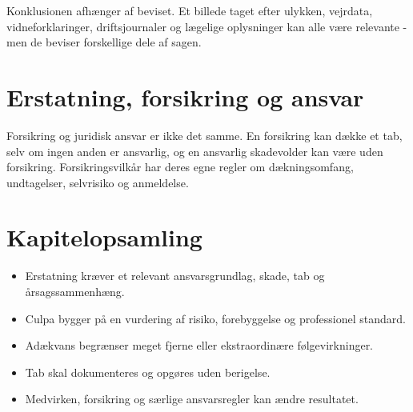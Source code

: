 Konklusionen afhænger af beviset. Et billede taget efter ulykken, vejrdata, vidneforklaringer, driftsjournaler og lægelige oplysninger kan alle være relevante - men de beviser forskellige dele af sagen.

\section{Erstatning, forsikring og ansvar}

Forsikring og juridisk ansvar er ikke det samme. En forsikring kan dække et tab, selv om ingen anden er ansvarlig, og en ansvarlig skadevolder kan være uden forsikring. Forsikringsvilkår har deres egne regler om dækningsomfang, undtagelser, selvrisiko og anmeldelse.



\section*{Kapitelopsamling}
\begin{itemize}
  \item Erstatning kræver et relevant ansvarsgrundlag, skade, tab og årsagssammenhæng.
  \item Culpa bygger på en vurdering af risiko, forebyggelse og professionel standard.
  \item Adækvans begrænser meget fjerne eller ekstraordinære følgevirkninger.
  \item Tab skal dokumenteres og opgøres uden berigelse.
  \item Medvirken, forsikring og særlige ansvarsregler kan ændre resultatet.
\end{itemize}
